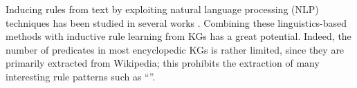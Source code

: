  Inducing rules from text by exploiting natural language processing (NLP) techniques has been studied in several works . Combining these linguistics-based methods with inductive rule learning from KGs has a great potential. Indeed, the number of predicates in most encyclopedic KGs is rather limited, since they are primarily extracted from Wikipedia; this prohibits the extraction of many interesting rule patterns such as ``''. %






